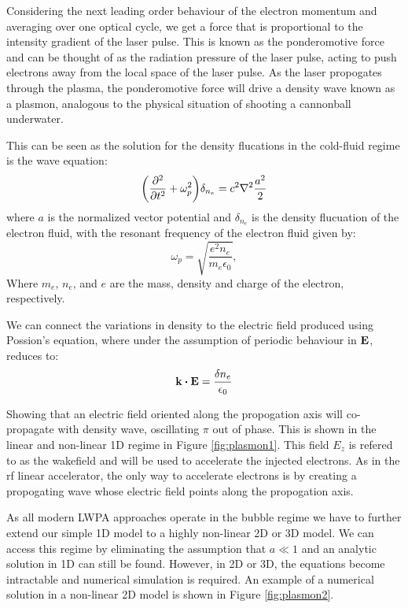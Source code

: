 \documentclass[12pt,letter]{article}
\begin{document}
Considering the next leading order behaviour of the electron momentum and
averaging over one
optical cycle, we get a force that is proportional to the intensity gradient of the laser pulse. This is known as the
ponderomotive force\cite{} and can be
thought of as the radiation pressure of the laser pulse, acting to push
electrons away from the local space of the laser pulse. As the laser propogates
through the plasma, the ponderomotive force will drive a density wave known as a
plasmon, analogous to the physical situation of shooting a
cannonball underwater.

This can be seen as the solution for the density flucations in the cold-fluid
regime is the wave
equation\cite{}:
\begin{equation}
    \label{eq:wave}
    \qty( \pdv[2]{t} + \omega_p^2 )\delta_{n_e} = c^2 \laplacian \frac{a^2}{2}
\end{equation}
where $a$ is the normalized vector potential and $\delta_{n_e}$ is the density flucuation
of the electron fluid, with the
resonant frequency of the electron fluid given by:
\begin{equation}
    \label{eq:wp}
    \omega_p = \sqrt{\frac{e^2 n_e}{m_e \epsilon_0}},
\end{equation}
Where $m_e$, $n_e$, and $e$ are the mass, density and charge of the electron, respectively.

We can connect the variations in density to
the electric field produced using Possion's equation, where under the assumption
of periodic behaviour in $\vb{E}$, reduces to:
\begin{equation}
    \vb{k}\dotproduct\vb{E} = \frac{\delta n_e}{\epsilon_0}
\end{equation}

Showing that an electric field oriented along the propogation axis will co-propagate
with density wave, oscillating $\pi$ out of phase. This is shown  in the linear
and non-linear 1D regime in Figure \ref{fig:plasmon1}. This field $E_z$ is
refered to as the wakefield\cite{} and will be used to accelerate the injected electrons. As in the rf linear accelerator,
the only way to accelerate electrons is by creating a propogating wave whose
electric field points along the propogation axis.

As all modern LWPA approaches operate in the
bubble regime we have to further extend our simple 1D model to a highly
non-linear  2D or 3D model. We can access this regime by eliminating
the assumption that $a \ll 1$ and an analytic solution in 1D can still be
found\cite{}. However, in 2D or 3D, the equations become intractable and numerical simulation is
required. An example of a numerical solution in a non-linear 2D model is shown
in Figure \ref{fig:plasmon2}.
\end{document}
